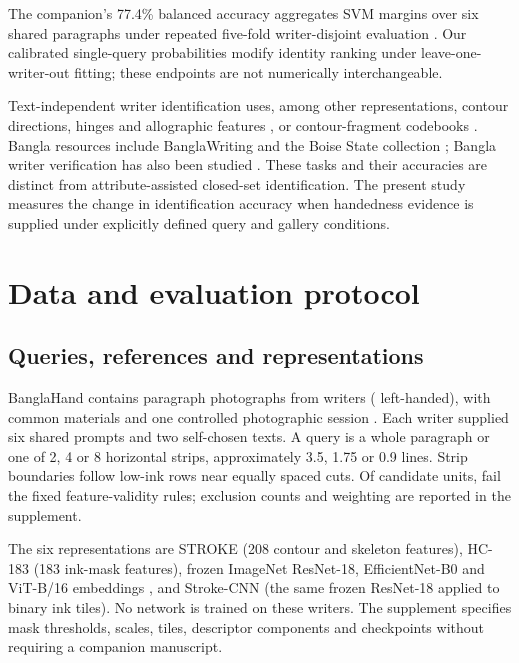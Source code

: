 \documentclass[5p,times,twocolumn,final,numbers,sort&compress]{elsarticle}
\begin{document}
The companion's 77.4\% balanced accuracy aggregates SVM margins over six shared paragraphs under repeated five-fold writer-disjoint evaluation \cite{prappo2026handedness}. Our calibrated single-query probabilities modify identity ranking under leave-one-writer-out fitting; these endpoints are not numerically interchangeable.

Text-independent writer identification uses, among other representations, contour directions, hinges and allographic features \cite{bulacu2007text}, or contour-fragment codebooks \cite{schomaker2007codebooks}. Bangla resources include BanglaWriting \cite{mridha2021banglawriting} and the Boise State collection \cite{majid2018bangla}; Bangla writer verification has also been studied \cite{paul2024bangla}. These tasks and their accuracies are distinct from attribute-assisted closed-set identification. The present study measures the change in identification accuracy when handedness evidence is supplied under explicitly defined query and gallery conditions.

\section{Data and evaluation protocol}
\label{sec:protocol}
\subsection{Queries, references and representations}
BanglaHand contains \rImages{} paragraph photographs from \rWriters{} writers (\rLeft{} left-handed), with common materials and one controlled photographic session \cite{banglahand2026data}. Each writer supplied six shared prompts and two self-chosen texts. A query is a whole paragraph or one of 2, 4 or 8 horizontal strips, approximately 3.5, 1.75 or 0.9 lines. Strip boundaries follow low-ink rows near equally spaced cuts. Of \rUnits{} candidate units, \rInvalid{} fail the fixed feature-validity rules; exclusion counts and weighting are reported in the supplement.

The six representations are STROKE (208 contour and skeleton features), HC-183 (183 ink-mask features), frozen ImageNet ResNet-18, EfficientNet-B0 and ViT-B/16 embeddings \cite{he2016resnet,tan2019efficientnet,dosovitskiy2021vit}, and Stroke-CNN (the same frozen ResNet-18 applied to binary ink tiles). No network is trained on these writers. The supplement specifies mask thresholds, scales, tiles, descriptor components and checkpoints without requiring a companion manuscript.
\end{document}
